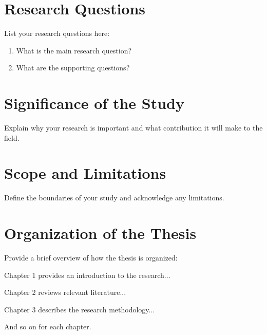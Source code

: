 \section{Research Questions}

List your research questions here:

\begin{enumerate}
    \item What is the main research question?
    \item What are the supporting questions?
\end{enumerate}

\section{Significance of the Study}

Explain why your research is important and what contribution it will make to the field.

\section{Scope and Limitations}

Define the boundaries of your study and acknowledge any limitations.

\section{Organization of the Thesis}

Provide a brief overview of how the thesis is organized:

Chapter 1 provides an introduction to the research...

Chapter 2 reviews relevant literature...

Chapter 3 describes the research methodology...

And so on for each chapter.
